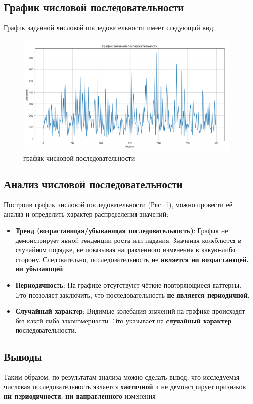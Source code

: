 \subsection{График числовой последовательности}
График заданной числовой последовательности имеет следующий вид:

\begin{figure}[h]
	\centering
	\includegraphics[width=1\textwidth]{../data/sequence.png}
	\caption{график числовой последовательности}
\end{figure}

\subsection{Анализ числовой последовательности}

Построив график числовой последовательности (Рис. 1), можно провести её анализ и определить характер распределения значений:

\begin{itemize}
	\item \textbf{Тренд (возрастающая/убывающая последовательность)}: График не демонстрирует явной тенденции роста или падения. Значения колеблются в случайном порядке, не показывая направленного изменения в какую-либо сторону. Следовательно, последовательность \textbf{не является ни возрастающей, ни убывающей}.

	\item \textbf{Периодичность}: На графике отсутствуют чёткие повторяющиеся паттерны. Это позволяет заключить, что последовательность \textbf{не является периодичной}.

	\item \textbf{Случайный характер}: Видимые колебания значений на графике происходят без какой-либо закономерности. Это указывает на \textbf{случайный характер} последовательности.
\end{itemize}

\subsection{Выводы}

Таким образом, по результатам анализа можно сделать вывод, что исследуемая числовая последовательность является \textbf{хаотичной} и не демонстрирует признаков \textbf{ни периодичности}, \textbf{ни направленного} изменения.

